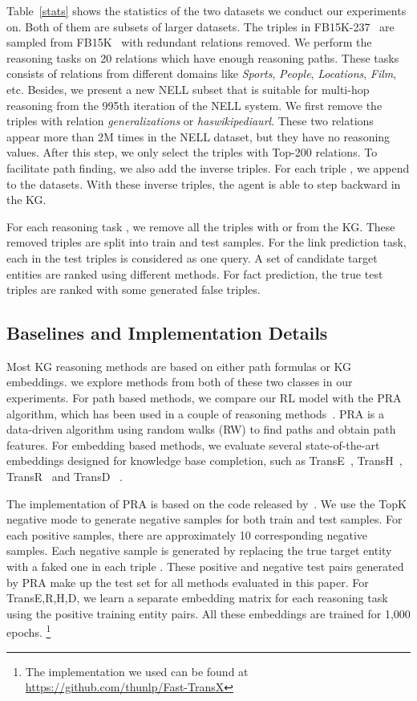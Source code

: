 \documentclass[11pt,letterpaper]{article}
\begin{document}
Table~\ref{stats} shows the statistics of the two datasets we conduct our experiments on. Both of them are subsets of larger datasets. The triples in FB15K-237~\cite{toutanova2015representing} are sampled from FB15K~\cite{bordes2013translating} with redundant relations removed. We perform the reasoning tasks on 20 relations which have enough reasoning paths. These tasks consists of relations from different domains like \textit{Sports}, \textit{People}, \textit{Locations}, \textit{Film}, etc. Besides, we present a new NELL subset that is suitable for multi-hop reasoning from the 995th iteration of the NELL system. We first remove the triples with relation \textit{generalizations} or \textit{haswikipediaurl}. These two relations appear more than 2M times in the NELL dataset, but they have no reasoning values. After this step, we only select the triples with Top-200 relations. To facilitate path finding, we also add the inverse triples. For each triple , we append  to the datasets. With these inverse triples, the agent is able to step backward in the KG.

For each reasoning task , we remove all the triples with  or  from the KG. These removed triples are split into train and test samples. For the link prediction task, each  in the test triples  is considered as one query. A set of candidate target entities are ranked using different methods. For fact prediction, the true test triples are ranked with some generated false triples.

\subsection{Baselines and Implementation Details}
Most KG reasoning methods are based on either path formulas or KG embeddings. we explore methods from both of these two classes in our experiments. For path based methods, we compare our RL model with the PRA~\cite{lao2011random} algorithm, which has been used in a couple of reasoning methods~\cite{gardner2013improving,neelakantan2015compositional}. PRA is a data-driven algorithm using random walks (RW) to find paths and obtain path features. For embedding based methods, we evaluate several state-of-the-art embeddings designed for knowledge base completion, such as  TransE~\cite{bordes2013translating}, TransH~\cite{wang2014knowledge}, TransR~\cite{lin2015learning} and TransD~\cite{ji2015knowledge} .

The implementation of PRA is based on the code released by~\cite{lao2011random}. We use the TopK negative mode to generate negative samples for both train and test samples. For each positive samples, there are approximately 10 corresponding negative samples. Each negative sample is generated by replacing the true target entity  with a faked one  in each triple . These positive and negative test pairs generated by PRA make up the test set for all methods evaluated in this paper. For Trans{E,R,H,D}, we learn a separate embedding matrix for each reasoning task using the positive training entity pairs. All these embeddings are trained for 1,000 epochs. \footnote{The implementation we used can be found at \url{https://github.com/thunlp/Fast-TransX}}
\end{document}
